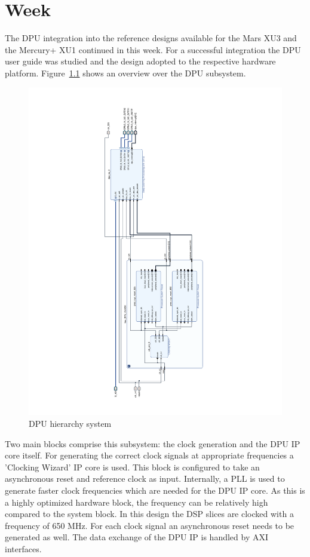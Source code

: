 \chapter{Week}
The \ac{DPU} integration into the reference designs available for the Mars XU3 and the Mercury+ XU1 continued in this week. For a successful integration the \ac{DPU} user guide was studied and the design adopted to the respective hardware platform. Figure~\ref{fig:dpu_hier} shows an overview over the \ac{DPU} subsystem.
\begin{figure}[!htb]
	\centering
		\includegraphics[width=\textwidth]{bilder/dpu_hier.pdf}
		\caption{\acs{DPU} hierarchy system}
		\label{fig:dpu_hier}
\end{figure}
Two main blocks comprise this subsystem: the clock generation and the \ac{DPU} \ac{IP} core itself. For generating the correct clock signals at appropriate frequencies a 'Clocking Wizard' \ac{IP} core is used. This block is configured to take an asynchronous reset and reference clock as input. Internally, a \ac{PLL} is used to generate faster clock frequencies which are needed for the \ac{DPU} \ac{IP} core. As this is a highly optimized hardware block, the frequency can be relatively high compared to the system block. In this design the \ac{DSP} slices are clocked with a frequency of 650 MHz. For each clock signal an asynchronous reset needs to be generated as well. The data exchange of the \ac{DPU} \ac{IP} is handled by \ac{AXI} interfaces.